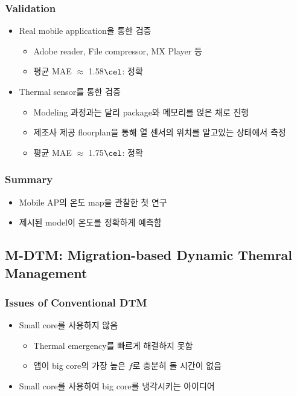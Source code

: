 \subsubsection*{Validation}
\begin{itemize}
    \item Real mobile application을 통한 검증
    \begin{itemize}
        \item Adobe reader, File compressor, MX Player 등
        \item 평균 MAE $\approx$ 1.58$\cel$: 정확
    \end{itemize}
    \item Thermal sensor를 통한 검증
    \begin{itemize}
        \item Modeling 과정과는 달리 package와 메모리를 얹은 채로 진행
        \item 제조사 제공 floorplan을 통해 열 센서의 위치를 알고있는 상태에서 측정
        \item 평균 MAE $\approx$ 1.75$\cel$: 정확
    \end{itemize}
\end{itemize}

\subsubsection*{Summary}
\begin{itemize}
    \item Mobile AP의 온도 map을 관찰한 첫 연구
    \item 제시된 model이 온도를 정확하게 예측함
\end{itemize}

\subsection{M-DTM: Migration-based Dynamic Themral Management}

\subsubsection*{Issues of Conventional DTM}
\begin{itemize}
    \item Small core를 사용하지 않음
    \begin{itemize}
        \item Thermal emergency를 빠르게 해결하지 못함
        \item 앱이 big core의 가장 높은 $f$로 충분히 돌 시간이 없음
    \end{itemize}
    \item Small core를 사용하여 big core를 냉각시키는 아이디어
\end{itemize}

